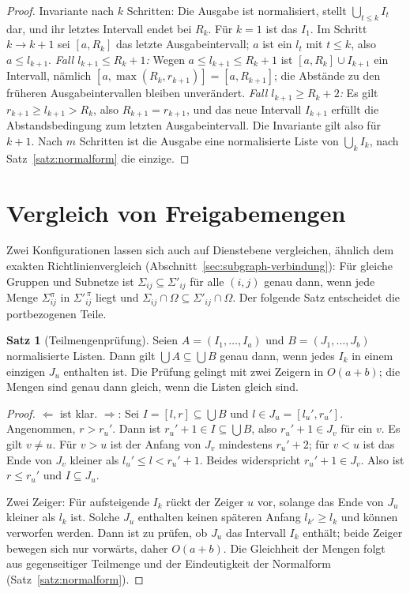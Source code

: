 \documentclass[a4paper,12pt, twoside]{report}
\theoremstyle{definition}
\newtheorem{satz}{Satz}
\begin{document}
\begin{proof}
	Invariante nach $k$ Schritten: Die Ausgabe ist normalisiert, stellt $\bigcup_{t\le k}I_t$ dar, und ihr letztes Intervall endet bei $R_k$. Für $k=1$ ist das $I_1$. Im Schritt $k\to k+1$ sei $[a,R_k]$ das letzte Ausgabeintervall; $a$ ist ein $l_t$ mit $t\le k$, also $a\le l_{k+1}$. \emph{Fall $l_{k+1}\le R_k+1$:} Wegen $a\le l_{k+1}\le R_k+1$ ist $[a,R_k]\cup I_{k+1}$ ein Intervall, nämlich $[a,\max(R_k,r_{k+1})]=[a,R_{k+1}]$; die Abstände zu den früheren Ausgabeintervallen bleiben unverändert. \emph{Fall $l_{k+1}\ge R_k+2$:} Es gilt $r_{k+1}\ge l_{k+1}>R_k$, also $R_{k+1}=r_{k+1}$, und das neue Intervall $I_{k+1}$ erfüllt die Abstandsbedingung zum letzten Ausgabeintervall. Die Invariante gilt also für $k+1$. Nach $m$ Schritten ist die Ausgabe eine normalisierte Liste von $\bigcup_kI_k$, nach Satz~\ref{satz:normalform} die einzige.
\end{proof}

\section{Vergleich von Freigabemengen}

Zwei Konfigurationen lassen sich auch auf Dienstebene vergleichen, ähnlich dem exakten Richtlinienvergleich (Abschnitt~\ref{sec:subgraph-verbindung}): Für gleiche Gruppen und Subnetze ist $\Sigma_{ij}\subseteq\Sigma'_{ij}$ für alle $(i,j)$ genau dann, wenn jede Menge $\Sigma^\pi_{ij}$ in $\Sigma'^{\,\pi}_{ij}$ liegt und $\Sigma_{ij}\cap\Omega\subseteq\Sigma'_{ij}\cap\Omega$. Der folgende Satz entscheidet die portbezogenen Teile.

\begin{satz}[Teilmengenprüfung]
\label{satz:teilmenge}
	Seien $A=(I_1,\ldots,I_a)$ und $B=(J_1,\ldots,J_b)$ normalisierte Listen. Dann gilt $\bigcup A\subseteq\bigcup B$ genau dann, wenn jedes $I_k$ in einem einzigen $J_u$ enthalten ist. Die Prüfung gelingt mit zwei Zeigern in $O(a+b)$; die Mengen sind genau dann gleich, wenn die Listen gleich sind.
\end{satz}

\begin{proof}
	\glqq$\Leftarrow$\grqq{} ist klar. \glqq$\Rightarrow$\grqq{}: Sei $I=[l,r]\subseteq\bigcup B$ und $l\in J_u=[l_u',r_u']$. Angenommen, $r>r_u'$. Dann ist $r_u'+1\in I\subseteq\bigcup B$, also $r_u'+1\in J_v$ für ein $v$. Es gilt $v\ne u$. Für $v>u$ ist der Anfang von $J_v$ mindestens $r_u'+2$; für $v<u$ ist das Ende von $J_v$ kleiner als $l_u'\le l<r_u'+1$. Beides widerspricht $r_u'+1\in J_v$. Also ist $r\le r_u'$ und $I\subseteq J_u$.

	Zwei Zeiger: Für aufsteigende $I_k$ rückt der Zeiger $u$ vor, solange das Ende von $J_u$ kleiner als $l_k$ ist. Solche $J_u$ enthalten keinen späteren Anfang $l_{k'}\ge l_k$ und können verworfen werden. Dann ist zu prüfen, ob $J_u$ das Intervall $I_k$ enthält; beide Zeiger bewegen sich nur vorwärts, daher $O(a+b)$. Die Gleichheit der Mengen folgt aus gegenseitiger Teilmenge und der Eindeutigkeit der Normalform (Satz~\ref{satz:normalform}).
\end{proof}
\end{document}
